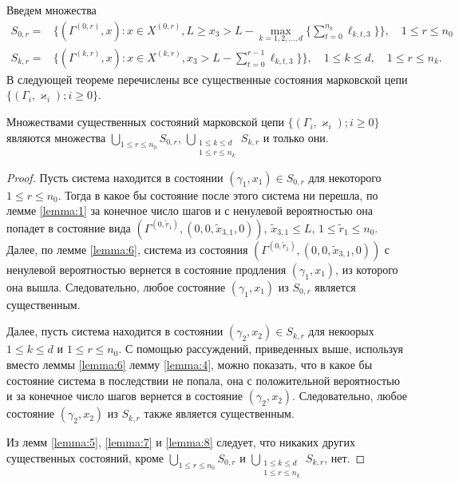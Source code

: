 \documentclass[a4paper,12pt,russian]{extarticle}
\newcommand{\Mark}{\{(\Gamma_i, \varkappa_i); i \geqslant 0\}}
\begin{document}
Введем множества
\begin{equation*}
\begin{aligned}
S_{0,r} = & \{(\Gamma^{(0,r)},x) \colon x\in X^{(0,r)}, L \geqslant x_3 > L - \max\limits_{k=1, 2, \ldots, d}\{\sum_{t=0}^{n_k} \ell_{k,t,3}\}\}, \quad 1 \leqslant r \leqslant n_0 \\
S_{k,r} = & \{(\Gamma^{(k,r)},x) \colon x\in X^{(k,r)},x_3 > L - \sum_{t=0}^{r-1} \ell_{k,t,3}\} \}, \quad 1 \leqslant k \leqslant d,\quad 1 \leqslant r \leqslant n_k.
\end{aligned}
\end{equation*}
В следующей теореме перечислены все существенные состояния марковской цепи $\Mark$.
\begin{theorem}
Множествами существенных состояний марковской цепи $\Mark$ являются множества $\bigcup\limits_{1 \leqslant r \leqslant n_0}S_{0,r}$, $\bigcup\limits_{\substack{1 \leqslant k \leqslant d\\ 1 \leqslant r \leqslant n_k}} S_{k,r}$ и только они.
\end{theorem}
\begin{proof}
Пусть система находится в состоянии $(\gamma_1,x_1) \in S_{0,r}$ для некоторого $1 \leqslant r \leqslant n_0$. Тогда в какое бы состояние после этого система ни перешла, по лемме \ref{lemma:1} за конечное число шагов и с ненулевой вероятностью она попадет в состояние вида $(\Gamma^{(0,\tilde{r}_1)}, (0,0,\tilde{x}_{3,1},0))$, $\tilde{x}_{3,1} \leqslant L$, $1 \leqslant \tilde{r}_1 \leqslant n_0$.  Далее, по лемме \ref{lemma:6}, система из состояния $(\Gamma^{(0,\tilde{r}_1)}, (0,0,\tilde{x}_{3,1},0))$ с ненулевой вероятностью вернется в состояние продления $(\gamma_1,x_1)$, из которого она вышла. Следовательно, любое состояние $(\gamma_1,x_1)$ из $S_{0,r}$ является существенным.

Далее, пусть система находится в состоянии $(\gamma_2,x_2) \in S_{k,r}$ для некоорых $1 \leqslant k \leqslant d$ и  $1 \leqslant r \leqslant n_0$. С помощью рассуждений, приведенных выше, используя вместо леммы \ref{lemma:6} лемму \ref{lemma:4}, можно показать, что в какое бы состояние система в последствии не попала, она с положительной вероятностью и за конечное число шагов вернется в состояние $(\gamma_2,x_2)$. Следовательно, любое состояние $(\gamma_2,x_2)$ из $S_{k,r}$ также является существенным.

Из лемм \ref{lemma:5}, \ref{lemma:7} и \ref{lemma:8} следует, что никаких других существенных состояний, кроме $\bigcup\limits_{1 \leqslant r \leqslant n_0}S_{0,r}$ и $\bigcup\limits_{\substack{1 \leqslant k \leqslant d\\ 1 \leqslant r \leqslant n_k}} S_{k,r}$,  нет.
\end{proof}
\end{document}
